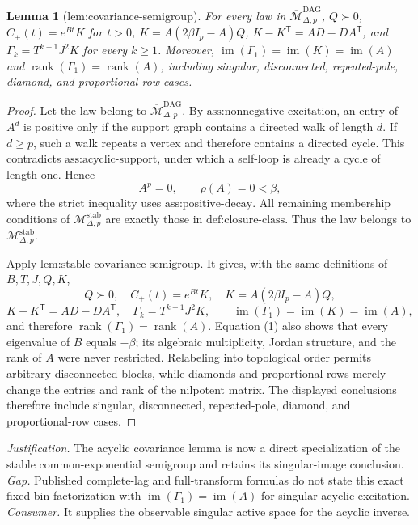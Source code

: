 \documentclass{article}
\newtheorem{lemma}{Lemma}
\begin{document}
\begin{lemma}[lem:covariance-semigroup]\label{lem:covariance-semigroup}
For every law in \(\overline{\mathcal M}_{\Delta,p}^{\mathrm{DAG}}\), \(Q\succ0\), \(C_{+}(t)=e^{Bt}K\) for \(t>0\), \(K=A(2\beta I_p-A)Q\), \(K-K^{\mathsf T}=AD-DA^{\mathsf T}\), and \(\Gamma_k=T^{k-1}J^2K\) for every \(k\geq1\). Moreover, \(\operatorname{im}(\Gamma_1)=\operatorname{im}(K)=\operatorname{im}(A)\) and \(\operatorname{rank}(\Gamma_1)=\operatorname{rank}(A)\), including singular, disconnected, repeated-pole, diamond, and proportional-row cases.
\end{lemma}
\begin{proof}
Let the law belong to \(\overline{\mathcal M}_{\Delta,p}^{\mathrm{DAG}}\).  By \(\text{ass:nonnegative-excitation}\), an entry of \(A^d\) is positive only if the support graph contains a directed walk of length \(d\).  If \(d\geq p\), such a walk repeats a vertex and therefore contains a directed cycle.  This contradicts \(\text{ass:acyclic-support}\), under which a self-loop is already a cycle of length one.  Hence
\[
 A^p=0,\qquad \rho(A)=0<\beta,
\tag{1}
\]
where the strict inequality uses \(\text{ass:positive-decay}\).  All remaining membership conditions of \(\mathcal M_{\Delta,p}^{\mathrm{stab}}\) are exactly those in \(\text{def:closure-class}\).  Thus the law belongs to \(\mathcal M_{\Delta,p}^{\mathrm{stab}}\).

Apply \(\text{lem:stable-covariance-semigroup}\).  It gives, with the same definitions of \(B,T,J,Q,K\),
\[
 Q\succ0,\quad C_+(t)=e^{Bt}K,\quad K=A(2\beta I_p-A)Q,
\]
\[
 K-K^{\mathsf T}=AD-DA^{\mathsf T},\quad
 \Gamma_k=T^{k-1}J^2K,\qquad
 \operatorname{im}(\Gamma_1)=\operatorname{im}(K)=\operatorname{im}(A),
\]
and therefore \(\operatorname{rank}(\Gamma_1)=\operatorname{rank}(A)\).  Equation (1) also shows that every eigenvalue of \(B\) equals \(-\beta\); its algebraic multiplicity, Jordan structure, and the rank of \(A\) were never restricted.  Relabeling into topological order permits arbitrary disconnected blocks, while diamonds and proportional rows merely change the entries and rank of the nilpotent matrix.  The displayed conclusions therefore include singular, disconnected, repeated-pole, diamond, and proportional-row cases.
\end{proof}
\par\smallskip\noindent \textit{Justification.} The acyclic covariance lemma is now a direct specialization of the stable common-exponential semigroup and retains its singular-image conclusion. \textit{Gap.} Published complete-lag and full-transform formulas do not state this exact fixed-bin factorization with \(\operatorname{im}(\Gamma_1)=\operatorname{im}(A)\) for singular acyclic excitation. \textit{Consumer.} It supplies the observable singular active space for the acyclic inverse.
\end{document}
